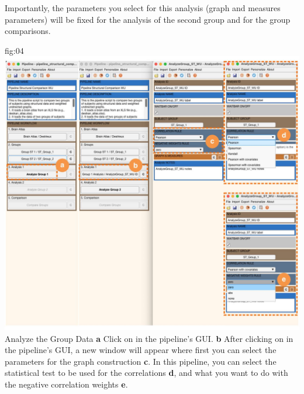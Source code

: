 \documentclass[justified]{tufte-handout}
\begin{document}
Importantly, the parameters you select for this analysis (graph and measures parameters) will be fixed for the analysis of the second group and for the group comparisons.

	{fig:04}
	{
	\includegraphics{fig04.jpg}
	}
	{Analyze the Group Data}
	{
	{\bf a} Click on  in the pipeline's GUI.
        {\bf b} After clicking on  in the pipeline's GUI, a new window will appear where first you can select the parameters for the graph construction {\bf c}. In this pipeline, you can select the statistical test to be used for the correlations {\bf d}, and what you want to do with the negative correlation weights {\bf e}.
	}
\end{document}
